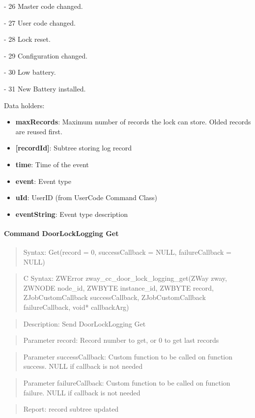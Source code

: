 - 26 Master code changed. 

- 27 User code changed. 

- 28 Lock reset. 

- 29 Configuration changed. 

- 30 Low battery. 

- 31 New Battery installed.
\newline

\noindent
Data holders:

\begin{itemize}
\item \textbf{maxRecords}: Maximum number of records the lock can store. Olded records are reused first.
\item \textbf{[recordId]}: Subtree storing log record
\item \qquad\textbf{time}: Time of the event
\item \qquad\textbf{event}: Event type
\item \qquad\textbf{uId}: UserID (from UserCode Command Class)
\item \qquad\textbf{eventString}: Event type description
\end{itemize}

\paragraph{Command DoorLockLogging Get}
\begin{quote}Syntax: Get(record = 0, successCallback = NULL, failureCallback = NULL)\end{quote}
\begin{quote}C Syntax: ZWError zway\_cc\_door\_lock\_logging\_get(ZWay zway, ZWNODE node\_id, ZWBYTE instance\_id, ZWBYTE record, ZJobCustomCallback successCallback, ZJobCustomCallback failureCallback, void* callbackArg)\end{quote}
\begin{quote}Description: Send DoorLockLogging Get\end{quote}
\begin{quote}Parameter record: Record number to get, or 0 to get last records\end{quote}
\begin{quote}Parameter successCallback: Custom function to be called on function success. NULL if callback is not needed\end{quote}
\begin{quote}Parameter failureCallback: Custom function to be called on function failure. NULL if callback is not needed\end{quote}
\begin{quote}Report: record subtree updated\end{quote}


